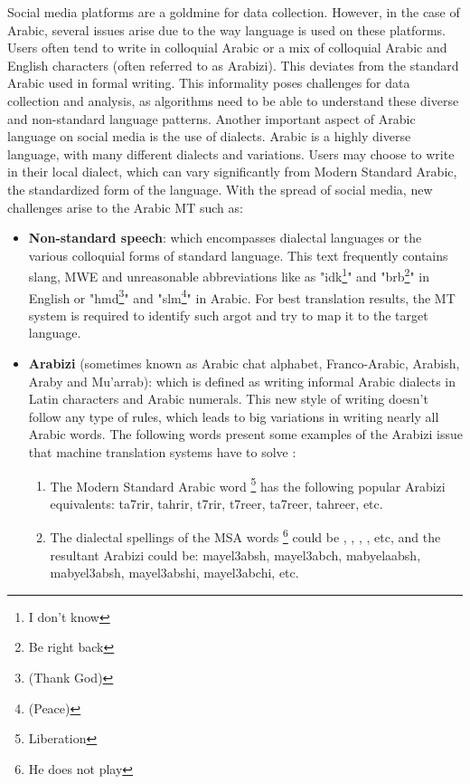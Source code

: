 Social media platforms are a goldmine for data collection. 
However, in the case of Arabic, several issues arise due to the way language is used on these platforms. 
Users often tend to write in colloquial Arabic or a mix of colloquial Arabic and English characters (often referred to as Arabizi). 
This deviates from the standard Arabic used in formal writing. 
This informality poses challenges for data collection and analysis, as algorithms need to be able to understand these diverse and non-standard language patterns.
Another important aspect of Arabic language on social media is the use of dialects.
Arabic is a highly diverse language, with many different dialects and variations.
Users may choose to write in their local dialect, which can vary significantly from Modern Standard Arabic, the standardized form of the language.
With the spread of social media, new challenges arise to the Arabic MT such as:   
\begin{itemize}
	\item  \textbf{Non-standard speech}: which encompasses dialectal languages or the various colloquial forms of standard language. This text frequently contains slang, MWE and unreasonable abbreviations \cite{Moussallem19} like as "idk\footnote{I don’t know}" and "brb\footnote{Be right back}" in English or "hmd\footnote{ (Thank God)}" and "slm\footnote{ (Peace)}" in Arabic. For best translation results, the MT system is required
	to identify such argot and try to map it to the target language.
	
	\item \textbf{Arabizi} (sometimes known as Arabic chat alphabet, Franco-Arabic, Arabish, Araby and	Mu’arrab): which is defined as writing informal Arabic dialects in Latin characters and Arabic numerals. This new style of writing doesn’t follow any type of rules, which leads to big variations in writing nearly all Arabic words. The following words present some examples of the Arabizi issue that machine translation systems have to solve \cite{Darwish15}:
	\begin{enumerate}
		\item The Modern Standard Arabic word \footnote{Liberation} has the following popular Arabizi equivalents: ta7rir, tahrir, t7rir, t7reer, ta7reer, tahreer, etc.
		\item The dialectal spellings of the MSA words \footnote{He does not play} could be , , , ,  etc, and the resultant Arabizi could be: mayel3absh, mayel3abch, mabyelaabsh, mabyel3absh, mayel3abshi, mayel3abchi, etc.
	\end{enumerate}
\end{itemize}


